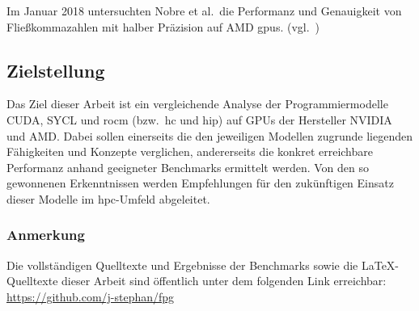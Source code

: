 Im Januar 2018 untersuchten Nobre et al.\ die Performanz und Genauigkeit von
Fließkommazahlen mit halber Präzision auf AMD \gls{gpu}s.
(vgl.~\cite{nobre2018})

\subsection{Zielstellung}
\label{einleitung:zielstellung}

Das Ziel dieser Arbeit ist ein vergleichende Analyse der Programmiermodelle
CUDA, SYCL und \gls{rocm} (bzw.\ \gls{hc} und \gls{hip}) auf GPUs der Hersteller
NVIDIA und AMD. Dabei sollen einerseits die den jeweiligen Modellen zugrunde
liegenden Fähigkeiten und Konzepte verglichen, andererseits die konkret
erreichbare Performanz anhand geeigneter Benchmarks ermittelt werden. Von den so
gewonnenen Erkenntnissen werden Empfehlungen für den zukünftigen Einsatz dieser
Modelle im \gls{hpc}-Umfeld abgeleitet.

\subsubsection{Anmerkung}

Die vollständigen Quelltexte und Ergebnisse der Benchmarks sowie die
\LaTeX-Quelltexte dieser Arbeit sind öffentlich unter dem folgenden Link
erreichbar: \url{https://github.com/j-stephan/fpg}
